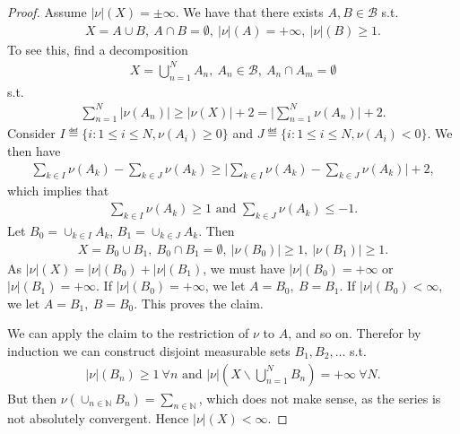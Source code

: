 \begin{proof}
    Assume \(|\nu|(X)=\pm\infty\). We have that there exists \(A,B\in\mathscr{B}\) s.t.
    \begin{align*}
        X = A\cup B, \ A\cap B= \emptyset, \ |\nu|(A) = +\infty, \ |\nu|(B)\geq 1.
    \end{align*}
    To see this, find a decomposition
    \begin{align*}
        X = \bigcup_{n=1}^{N}A_n, \ A_n\in\mathscr{B}, \ A_n\cap A_m = \emptyset
    \end{align*}
    s.t.
    \begin{align*}
        \sum\limits_{n=1}^{N}|\nu(A_n)| \geq |\nu(X)| + 2 = \Big\vert \sum\limits_{n=1}^{N}\nu(A_n)\Big\vert +2.
    \end{align*}
    Consider \(I\eqdef \{i:1\leq i\leq N, \nu(A_i)\geq0\}\) and \(J\eqdef \{i:1\leq i\leq N, \nu(A_i)<0\}\). We then have 
    \begin{align*}
        \sum\limits_{k\in I}\nu(A_k) - \sum\limits_{k\in J} \nu(A_k) \geq \Big\vert \sum\limits_{k\in I}\nu(A_k) - \sum\limits_{k\in J} \nu(A_k)\Big\vert + 2,
    \end{align*}
    which implies that 
    \begin{align*}
        \sum\limits_{k\in I} \nu(A_k) \geq 1 \text{ and } \sum\limits_{k\in J} \nu(A_k) \leq -1.
    \end{align*}
    Let \(B_0 = \cup_{k\in I}A_k\), \(B_1 = \cup_{k\in J}A_k\). Then
    \begin{align*}
        X = B_0 \cup B_1, \ B_0\cap B_1 = \emptyset, \ |\nu(B_0)|\geq 1, \ |\nu(B_1)| \geq 1.
    \end{align*}
    As \(|\nu|(X) = |\nu|(B_0) + |\nu|(B_1)\), we must have \(|\nu|(B_0) = + \infty\) or \(|\nu|(B_1) = + \infty\). If \(|\nu|(B_0)=+\infty\), we let \(A=B_0, \ B=B_1\). If \(|\nu|(B_0)<\infty\), we let \(A=B_1, \ B=B_0\). This proves the claim.

    We can apply the claim to the restriction of \(\nu\) to \(A\), and so on. Therefor by induction we can construct disjoint measurable sets \(B_1, B_2, ...\) s.t. 
    \begin{align*}
        |\nu|(B_n) \geq 1 \ \forall n \text{ and } |\nu|\left(X\backslash\bigcup\limits_{n=1}^{N}B_n\right) = +\infty \ \forall N.
    \end{align*}
    But then \(\nu(\cup_{n\in\mathbb{N}}B_n) = \sum_{n\in\mathbb{N}}\), which does not make sense, as the series is not absolutely convergent. Hence \(|\nu|(X)<\infty\).
\end{proof}
\fi 
